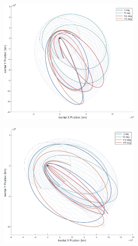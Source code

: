 \documentclass[letterpaper, paper,11pt]{AAS}	%
\begin{document}
\begin{figure}[h!]
    \begin{subfigure}{}
        \includegraphics[trim=75 50 0 0, clip, width=2.75in]{./figs/mooni_ThetaPlot_io_famE_vInf0.9.png}
    \end{subfigure}
    \begin{subfigure}{}
        \includegraphics[trim=75 50 0 0, clip, width=2.75in]{./figs/mooni_ThetaPlot_io_famE_vInf1.2.png}
    \end{subfigure}
\end{figure}
\end{document}
